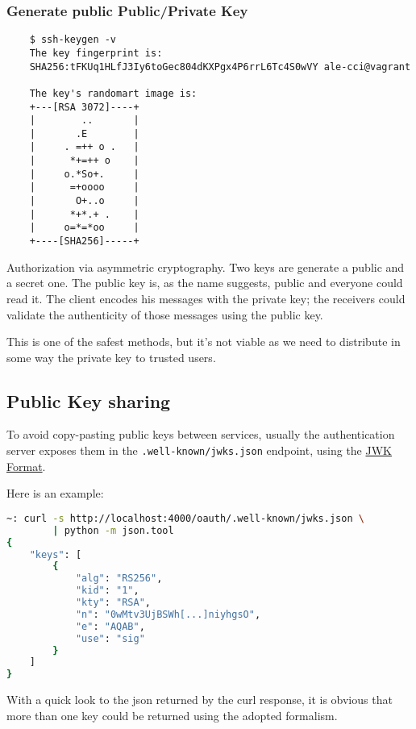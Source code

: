 \subsubsection{Generate public Public/Private Key}
\begin{verbatim}
    $ ssh-keygen -v
    The key fingerprint is:
    SHA256:tFKUq1HLfJ3Iy6toGec804dKXPgx4P6rrL6Tc4S0wVY ale-cci@vagrant

    The key's randomart image is:
    +---[RSA 3072]----+
    |        ..       |
    |       .E        |
    |     . =++ o .   |
    |      *+=++ o    |
    |     o.*So+.     |
    |      =+oooo     |
    |       O+..o     |
    |      *+*.+ .    |
    |     o=*=*oo     |
    +----[SHA256]-----+

\end{verbatim}
Authorization via asymmetric cryptography. Two keys are generate a public and a secret one.
The public key is, as the name suggests, public and everyone could read it.
The client encodes his messages with the private key; the receivers could validate the authenticity of those messages using the public key.

This is one of the safest methods, but it's not viable as we need to distribute in some way the private key to
trusted users.

\subsection{Public Key sharing}
\label{jwks}
To avoid copy-pasting public keys between services, usually the authentication
server exposes them in the \texttt{.well-known/jwks.json} endpoint, using the
\href{https://tools.ietf.org/html/rfc7517#section-4}{JWK Format}.

Here is an example:

\begin{lstlisting}[language=bash]
~: curl -s http://localhost:4000/oauth/.well-known/jwks.json \
        | python -m json.tool
{
    "keys": [
        {
            "alg": "RS256",
            "kid": "1",
            "kty": "RSA",
            "n": "0wMtv3UjBSWh[...]niyhgsO",
            "e": "AQAB",
            "use": "sig"
        }
    ]
}
\end{lstlisting}
With a quick look to the json returned by the curl response, it is obvious that
more than one key could be returned using the adopted formalism.

